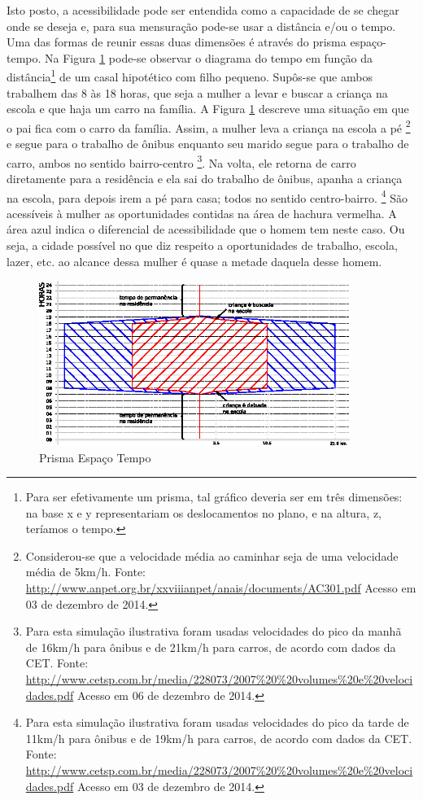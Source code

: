 Isto posto, a acessibilidade pode ser entendida como a capacidade de se chegar onde se deseja e, para sua mensuração pode-se usar a distância e/ou o tempo. Uma das formas de reunir essas duas dimensões é através do prisma espaço-tempo. Na Figura \ref{fig:prisma1} pode-se observar o diagrama do tempo em função da distância\footnote{Para ser efetivamente um prisma, tal gráfico deveria ser em três dimensões: na base x e y representariam os deslocamentos no plano, e na altura, z, teríamos o tempo.} de um casal hipotético com filho pequeno. Supôs-se que ambos trabalhem das 8 às 18 horas, que seja a mulher a levar e buscar a criança na escola e que haja um carro na família.
A Figura \ref{fig:prisma1} descreve uma situação em que o pai fica com o carro da família. Assim, a mulher leva a criança na escola a pé%
\footnote{Considerou-se que a velocidade média ao caminhar seja de uma velocidade média de 5km/h. Fonte: \url{http://www.anpet.org.br/xxviiianpet/anais/documents/AC301.pdf} Acesso em 03 de dezembro de 2014.} e segue para o trabalho de ônibus enquanto seu marido segue para o trabalho de carro, ambos no sentido bairro-centro%
\footnote{Para esta simulação ilustrativa foram usadas velocidades do pico da manhã de 16km/h para ônibus e de 21km/h para carros, de acordo com dados da CET. Fonte: \url{http://www.cetsp.com.br/media/228073/2007\%20\%20volumes\%20e\%20velocidades.pdf} Acesso em 06 de dezembro de 2014.}.
Na volta, ele retorna de carro diretamente para a residência e ela sai do trabalho de ônibus, apanha a criança na escola, para depois irem a pé para casa; todos no sentido centro-bairro.%
\footnote{Para esta simulação ilustrativa foram usadas velocidades do pico da tarde de 11km/h para ônibus e de 19km/h para carros, de acordo com dados da CET. Fonte: \url{http://www.cetsp.com.br/media/228073/2007\%20\%20volumes\%20e\%20velocidades.pdf} Acesso em 03 de dezembro de 2014.}
São acessíveis à mulher as oportunidades contidas na área de hachura vermelha. A área azul indica o diferencial de acessibilidade que o homem tem neste caso. Ou seja, a cidade possível no que diz respeito a oportunidades de trabalho, escola, lazer, etc. ao alcance dessa mulher é quase a metade daquela desse homem.

\begin{figure}[htb]%
    \caption{\label{fig:prisma1}Prisma Espaço Tempo}%
    \begin{center}%
        \includegraphics[width=0.9\textwidth]{./imagens/DIAGRAMA-ESPACO-TEMPO-final.eps}%
    \end{center}%
\end{figure}%

